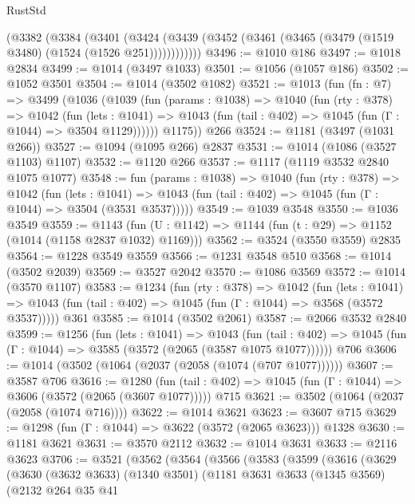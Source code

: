 \begin{lexlean}{RustStd}
\begin{coremodule}
      (@3382
        (@3384
          (@3401
            (@3424 (@3439 (@3452 (@3461 (@3465 (@3479 (@1519 @3480) (@1524 (@1526 @251))))))))))))
@3496 := @1010 @186
@3497 := @1018 @2834
@3499 := @1014 (@3497 @1033)
@3501 := @1056 (@1057 @186)
@3502 := @1052 @3501
@3504 := @1014 (@3502 @1082)
@3521 := @1013
    (fun (fn : @7) =>
    @3499
      (@1036
        (@1039
          (fun (params : @1038) =>
          @1040
            (fun (rty : @378) =>
            @1042
              (fun (lets : @1041) =>
              @1043 (fun (tail : @402) => @1045 (fun (Γ : @1044) => @3504 @1129))))))
        @1175))
    @266
@3524 := @1181 (@3497 (@1031 @266))
@3527 := @1094 (@1095 @266) @2837
@3531 := @1014 (@1086 (@3527 @1103) @1107)
@3532 := @1120 @266
@3537 := @1117 (@1119 @3532 @2840 @1075 @1077)
@3548 := fun (params : @1038) =>
  @1040
    (fun (rty : @378) =>
    @1042
      (fun (lets : @1041) =>
      @1043 (fun (tail : @402) => @1045 (fun (Γ : @1044) => @3504 (@3531 @3537)))))
@3549 := @1039 @3548
@3550 := @1036 @3549
@3559 := @1143 (fun (U : @1142) => @1144 (fun (t : @29) => @1152 (@1014 (@1158 @2837 @1032) @1169)))
@3562 := @3524 (@3550 @3559) @2835
@3564 := @1228 @3549 @3559
@3566 := @1231 @3548 @510
@3568 := @1014 (@3502 @2039)
@3569 := @3527 @2042
@3570 := @1086 @3569
@3572 := @1014 (@3570 @1107)
@3583 := @1234
    (fun (rty : @378) =>
    @1042
      (fun (lets : @1041) =>
      @1043 (fun (tail : @402) => @1045 (fun (Γ : @1044) => @3568 (@3572 @3537)))))
    @361
@3585 := @1014 (@3502 @2061)
@3587 := @2066 @3532 @2840
@3599 := @1256
    (fun (lets : @1041) =>
    @1043
      (fun (tail : @402) => @1045 (fun (Γ : @1044) => @3585 (@3572 (@2065 (@3587 @1075 @1077))))))
    @706
@3606 := @1014 (@3502 (@1064 (@2037 (@2058 (@1074 (@707 @1077))))))
@3607 := @3587 @706
@3616 := @1280
    (fun (tail : @402) => @1045 (fun (Γ : @1044) => @3606 (@3572 (@2065 (@3607 @1077)))))
    @715
@3621 := @3502 (@1064 (@2037 (@2058 (@1074 @716))))
@3622 := @1014 @3621
@3623 := @3607 @715
@3629 := @1298 (fun (Γ : @1044) => @3622 (@3572 (@2065 @3623))) @1328
@3630 := @1181 @3621
@3631 := @3570 @2112
@3632 := @1014 @3631
@3633 := @2116 @3623
@3706 := @3521
    (@3562
      (@3564
        (@3566
          (@3583
            (@3599
              (@3616
                (@3629
                  (@3630
                    (@3632 @3633)
                    (@1340 @3501)
                    (@1181
                      @3631
                      @3633
                      (@1345 @3569)
                      (@2132
                        @264
                        @35
                        @41

\end{coremodule}
\end{lexlean}
